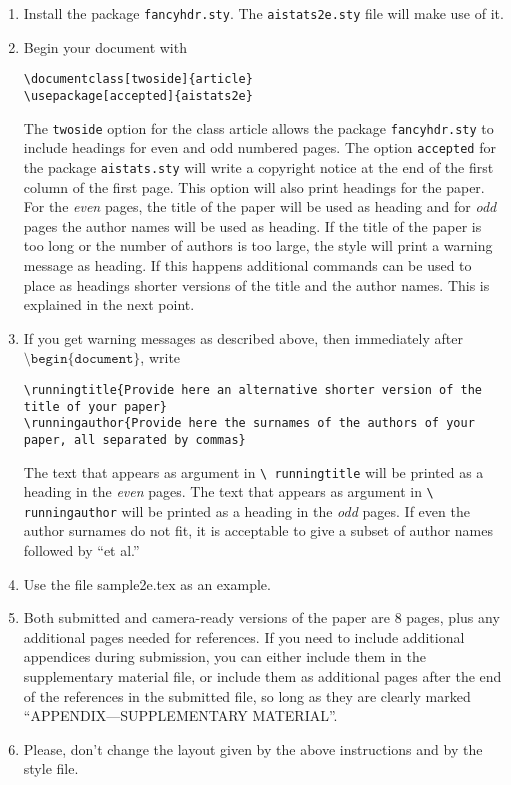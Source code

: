 \documentclass[twoside]{article}
\begin{document}
\begin{enumerate}
    \item Install the package \texttt{fancyhdr.sty}. The
    \texttt{aistats2e.sty} file will make use of it.
    \item Begin your document with
    \begin{flushleft}
    \texttt{\textbackslash documentclass[twoside]\{article\}}\\
    \texttt{\textbackslash usepackage[accepted]\{aistats2e\}}
    \end{flushleft}
    The \texttt{twoside} option for the class article allows the
    package \texttt{fancyhdr.sty} to include headings for even and odd
    numbered pages. The option \texttt{accepted} for the package
    \texttt{aistats.sty} will write a copyright notice at the end of
    the first column of the first page. This option will also print
    headings for the paper.  For the \emph{even} pages, the title of
    the paper will be used as heading and for \emph{odd} pages the
    author names will be used as heading.  If the title of the paper
    is too long or the number of authors is too large, the style will
    print a warning message as heading. If this happens additional
    commands can be used to place as headings shorter versions of the
    title and the author names. This is explained in the next point.
    \item  If you get warning messages as described above, then
    immediately after $\texttt{\textbackslash
    begin\{document\}}$, write
    \begin{flushleft}
    \texttt{\textbackslash runningtitle\{Provide here an alternative shorter version of the title of your
    paper\}}\\
    \texttt{\textbackslash runningauthor\{Provide here the surnames of the authors of your paper, all separated by
    commas\}}
    \end{flushleft}
    The text that appears as argument in \texttt{\textbackslash
      runningtitle} will be printed as a heading in the \emph{even}
    pages. The text that appears as argument in \texttt{\textbackslash
      runningauthor} will be printed as a heading in the \emph{odd}
    pages.  If even the author surnames do not fit, it is acceptable
    to give a subset of author names followed by ``et al.''

    \item Use the file sample2e.tex as an example.

    \item Both submitted and camera-ready versions of the paper are 8
      pages, plus any additional pages needed for references. If you
      need to include additional appendices during submission, you can
      either include them in the supplementary material file, or
      include them as additional pages after the end of the references
      in the submitted file, so long as they are clearly marked
      ``APPENDIX---SUPPLEMENTARY MATERIAL''.

    \item Please, don't change the layout given by the above
      instructions and by the style file.


\end{enumerate}
\end{document}
